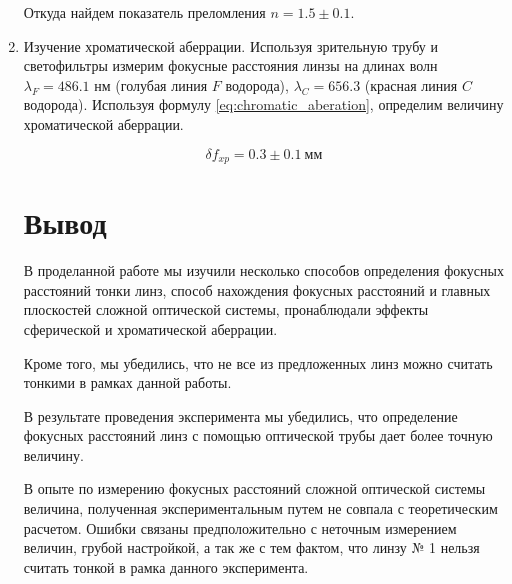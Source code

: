 \begin{enumerate}
		Откуда найдем показатель преломления $n = 1.5 \pm 0.1$.
		
		\item Изучение хроматической аберрации. Используя зрительную трубу и светофильтры измерим фокусные расстояния линзы на длинах волн $\lambda_F = 486.1$ нм (голубая линия $F$ водорода), $\lambda_C = 656.3$ (красная линия $C$ водорода). Используя формулу \eqref{eq:chromatic_aberation}, определим величину хроматической аберрации.
		
		\[ \delta f_{xp} = 0.3 \pm 0.1 ~ \text{мм} \] 
		
		\section*{Вывод}
		
		В проделанной работе мы изучили несколько способов определения фокусных расстояний тонки линз, способ нахождения фокусных расстояний и главных плоскостей сложной оптической системы, пронаблюдали эффекты сферической и хроматической аберрации. 
		
		Кроме того, мы убедились, что не все из предложенных линз можно считать тонкими в рамках данной работы.
		
		В результате проведения эксперимента мы убедились, что определение фокусных расстояний линз с помощью оптической трубы дает более точную величину.
		
		В опыте по измерению фокусных расстояний сложной оптической системы величина, полученная экспериментальным путем не совпала с теоретическим расчетом. Ошибки связаны предположительно с неточным измерением величин, грубой настройкой, а так же с тем фактом, что линзу № 1 нельзя считать тонкой в рамка данного эксперимента.  
		
	\end{enumerate}
	
